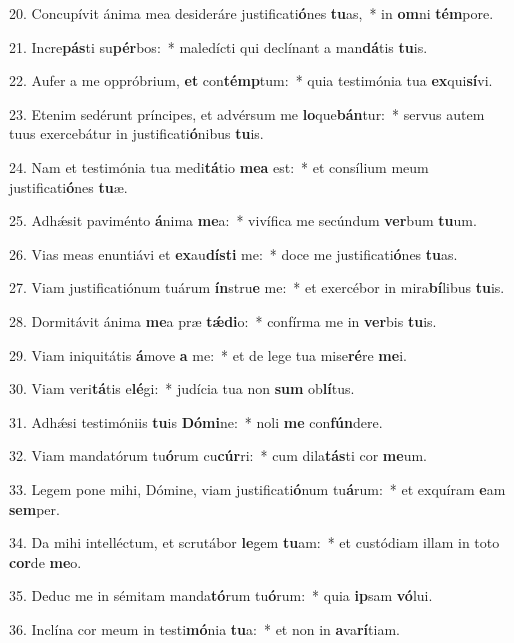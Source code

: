20. Concupívit ánima mea desideráre justificati\textbf{ó}nes \textbf{tu}as,~*  in \textbf{om}ni \textbf{tém}pore.\

21. Incre\textbf{pás}ti su\textbf{pér}bos:~*  maledícti qui declínant a man\textbf{dá}tis \textbf{tu}is.\

22. Aufer a me oppróbrium, \textbf{et} con\textbf{témp}tum:~*  quia testimónia tua \textbf{ex}qui\textbf{sí}vi.\

23. Etenim sedérunt príncipes, et advérsum me \textbf{lo}que\textbf{bán}tur:~*  servus autem tuus exercebátur in justificati\textbf{ó}nibus \textbf{tu}is.\

24. Nam et testimónia tua medi\textbf{tá}tio \textbf{me}\textbf{a} est:~*  et consílium meum justificati\textbf{ó}nes \textbf{tu}æ.\

25. Adhǽsit paviménto \textbf{á}nima \textbf{me}a:~*  vivífica me secúndum \textbf{ver}bum \textbf{tu}um.\

26. Vias meas enuntiávi et \textbf{ex}au\textbf{dís}\textbf{ti} me:~*  doce me justificati\textbf{ó}nes \textbf{tu}as.\

27. Viam justificatiónum tuárum \textbf{ín}stru\textbf{e} me:~*  et exercébor in mira\textbf{bí}libus \textbf{tu}is.\

28. Dormitávit ánima \textbf{me}a præ \textbf{tǽ}\textbf{di}o:~*  confírma me in \textbf{ver}bis \textbf{tu}is.\

29. Viam iniquitátis \textbf{á}move \textbf{a} me:~*  et de lege tua mise\textbf{ré}re \textbf{me}i.\

30. Viam veri\textbf{tá}tis e\textbf{lé}gi:~*  judícia tua non \textbf{sum} ob\textbf{lí}tus.\

31. Adhǽsi testimóniis \textbf{tu}is \textbf{Dó}\textbf{mi}ne:~*  noli \textbf{me} con\textbf{fún}dere.\

32. Viam mandatórum tu\textbf{ó}rum cu\textbf{cúr}ri:~*  cum dila\textbf{tás}ti cor \textbf{me}um.\

33. Legem pone mihi, Dómine, viam justificati\textbf{ó}num tu\textbf{á}rum:~*  et exquíram \textbf{e}am \textbf{sem}per.\

34. Da mihi intelléctum, et scrutábor \textbf{le}gem \textbf{tu}am:~*  et custódiam illam in toto \textbf{cor}de \textbf{me}o.\

35. Deduc me in sémitam manda\textbf{tó}rum tu\textbf{ó}rum:~*  quia \textbf{ip}sam \textbf{vó}lui.\

36. Inclína cor meum in testi\textbf{mó}nia \textbf{tu}a:~*  et non in \textbf{a}va\textbf{rí}tiam.\

